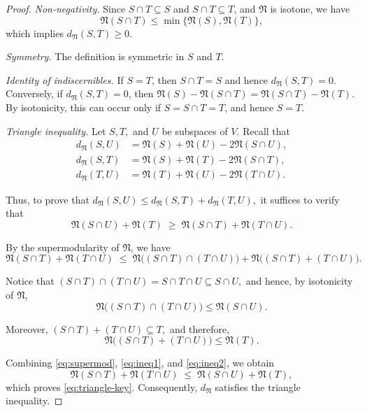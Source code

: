 \documentclass{svproc}
\begin{document}
\begin{proof}
\emph{Non-negativity.}
Since $S \cap T \subseteq S$ and $S \cap T \subseteq T$, and $\mathfrak N$ is
isotone, we have
\[
\mathfrak N(S \cap T) \le \min\{\mathfrak N(S),\mathfrak N(T)\},
\]
which implies $d_{\mathfrak N}(S,T) \ge 0$.

\emph{Symmetry.}
The definition is symmetric in $S$ and $T$.

\emph{Identity of indiscernibles.}
If $S=T$, then $S \cap T = S$ and hence $d_{\mathfrak N}(S,T)=0$.
Conversely, if $d_{\mathfrak N}(S,T)=0$, then $\mathfrak N(S)-\mathfrak N(S \cap T) = \mathfrak N(S \cap T)-\mathfrak N(T)$.
By isotonicity, this can occur only if $S=S\cap T=T$, and hence $S=T$.

\emph{Triangle inequality.}
Let $S,T,$ and $U$ be subspaces of $V$.
Recall that
\begin{align*}
d_{\mathfrak{N}}(S,U) &= \mathfrak{N}(S) + \mathfrak{N}(U) - 2\mathfrak{N}(S\cap U),\\
d_{\mathfrak{N}}(S,T) &= \mathfrak{N}(S) + \mathfrak{N}(T) - 2\mathfrak{N}(S\cap T),\\
d_{\mathfrak{N}}(T,U) &= \mathfrak{N}(T) + \mathfrak{N}(U) - 2\mathfrak{N}(T\cap U).
\end{align*}

Thus, to prove that
\(
d_{\mathfrak{N}}(S,U) \le d_{\mathfrak{N}}(S,T) + d_{\mathfrak{N}}(T,U),
\)
it suffices to verify that
\begin{equation}\label{eq:triangle-key}
\mathfrak{N}(S\cap U) + \mathfrak{N}(T) \;\ge\; \mathfrak{N}(S\cap T) + \mathfrak{N}(T\cap U).
\end{equation}

By the supermodularity of $\mathfrak{N}$, we have
\begin{equation}\label{eq:supermod}
\mathfrak{N}(S\cap T) + \mathfrak{N}(T\cap U)
\;\le\;
\mathfrak{N}\bigl((S\cap T)\cap (T\cap U)\bigr)
+
\mathfrak{N}\bigl((S\cap T) + (T\cap U)\bigr).
\end{equation}

Notice that
\(
(S\cap T)\cap (T\cap U) = S\cap T\cap U \subseteq S\cap U,
\)
and hence, by isotonicity of $\mathfrak{N}$,
\begin{equation}\label{eq:ineq1}
\mathfrak{N}\bigl((S\cap T)\cap (T\cap U)\bigr) \le \mathfrak{N}(S\cap U).
\end{equation}

Moreover,
\(
(S\cap T) + (T\cap U) \subseteq T,
\)
and therefore,
\begin{equation}\label{eq:ineq2}
\mathfrak{N}\bigl((S\cap T) + (T\cap U)\bigr) \le \mathfrak{N}(T).
\end{equation}

Combining \eqref{eq:supermod}, \eqref{eq:ineq1}, and \eqref{eq:ineq2}, we obtain
\[
\mathfrak{N}(S\cap T) + \mathfrak{N}(T\cap U)
\;\le\;
\mathfrak{N}(S\cap U) + \mathfrak{N}(T),
\]
which proves \eqref{eq:triangle-key}. Consequently, $d_{\mathfrak{N}}$ satisfies the triangle inequality.

\end{proof}
\end{document}
